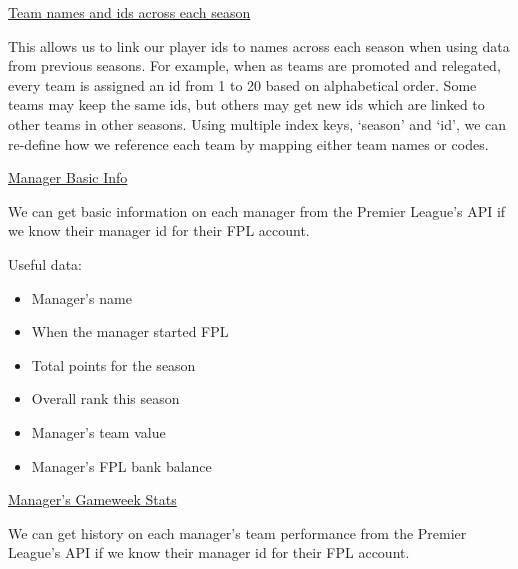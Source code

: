 \documentclass[12pt, a4paper, oneside]{book}
\numberwithin{equation}{section}
\begin{document}
\href{https://github.com/vaastav/Fantasy-Premier-League/blob/master/data/master_team_list.csv}{Team names and ids across each season}

\vspace{0.5cm}

This allows us to link our player ids to names across each season when using data from previous seasons. For example, when as teams are promoted and relegated, every team is assigned an id from 1 to 20 based on alphabetical order. Some teams may keep the same ids, but others may get new ids which are linked to other teams in other seasons. Using multiple index keys, `season' and `id', we can re-define how we reference each team by mapping either team names or codes.

\vspace{0.5cm}

\vspace{0.5cm}

\href{https://fantasy.premierleague.com/api/entry/123456/}{Manager Basic Info}

\vspace{0.5cm}

We can get basic information on each manager from the Premier League's API if we know their manager id for their FPL account.

\vspace{0.5cm}

Useful data:

\begin{itemize}
  \item Manager's name
  \item When the manager started FPL
  \item Total points for the season
  \item Overall rank this season
  \item Manager's team value
  \item Manager's FPL bank balance
\end{itemize}

\vspace{0.5cm}

\href{https://fantasy.premierleague.com/api/entry/123456/history/}{Manager's Gameweek Stats}

\vspace{0.5cm}

We can get history on each manager's team performance from the Premier League's API if we know their manager id for their FPL account.

\vspace{0.5cm}
\end{document}
